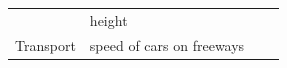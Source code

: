 {\begin{tabular}[t]{|l|l|l|l|}
    
     \tabularnewline\cline{1-1}\cline{2-2}\cline{3-3}\cline{4-4}
    
    
         &
    
    
        height &
    
    
         &
    
    
     \tabularnewline\cline{1-1}\cline{2-2}\cline{3-3}\cline{4-4}
    
    
        Transport &
    
    
        speed of cars on freeways &
    
    
         &
    

\end{tabular}}
